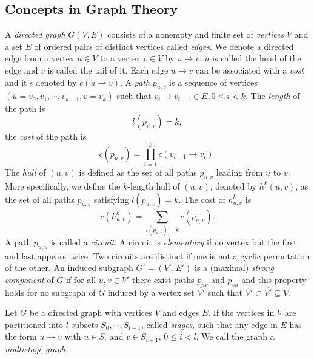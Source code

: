 \subsection{Concepts in Graph Theory}

A \textit{directed graph} $G(V, E)$ consists of a nonempty and finite set of \textit{vertices} $V$ and a set $E$ of ordered pairs of distinct vertices called \textit{edges}. We denote a directed edge from a vertex $u\in V$ to a vertex $v\in V$ by $u\rightarrow v$. $u$ is called the head of the edge and $v$ is called the tail of it. Each edge $u\rightarrow v$ can be associated with a \textit{cost} and it's denoted by $c(u\rightarrow v)$. A \textit{path} $p_{u,v}$ is a sequence of vertices $(u=v_0,v_1,\cdots,v_{k-1},v=v_k)$ such that $v_i\rightarrow v_{i+1}\in E, 0\leq i<k$. The \textit{length} of the path is
\[
    l(p_{u,v})=k,
\]
the \textit{cost} of the path is
\[
    c(p_{u,v})=\prod\limits_{i=1}^{k}c(v_{i-1}\rightarrow v_i).
\]
The \textit{hull} of $(u,v)$ is defined as the set of all paths $p_{u,v}$ leading from $u$ to $v$. More specifically, we define the $k$-length hull of $(u,v)$, denoted by $h^k(u,v)$, as the set of all paths $p_{u,v}$ satisfying $l(p_{u,v})=k$. The cost of $h^k_{u,v}$ is
\[
    c(h^k_{u,v})=\sum\limits_{l(p_{u,v})=k} c(p_{u,v}).
\]
A path $p_{u,u}$ is called a \textit{circuit}. A circuit is \textit{elementary} if no vertex but the first and last appears twice. Two circuits are distinct if one is not a cyclic permutation of the other. An induced subgraph $G'=(V',E')$ is a (maximal) \textit{strong component} of $G$ if for all $u, v\in V'$ there exist paths $p_{uv}$ and $p_{vu}$ and this property holds for no subgraph of $G$ induced by a vertex set $\overline{V'}$ such that $V' \subset \overline{V'} \subseteq V$.

Let $G$ be a directed graph with vertices $V$ and edges $E$. If the vertices in $V$ are partitioned into $l$ subsets $S_0,\cdots,S_{l-1}$, called \textit{stages}, such that any edge in $E$ has the form $u\rightarrow v$ with $u\in S_i$ and $v\in S_{i+1}$, $0\leq i<l$. We call the graph a \textit{multistage graph}.


